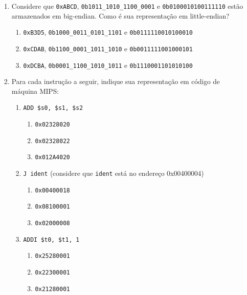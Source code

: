\documentclass{article}
\begin{document}
\begin{enumerate}
\begin{centering}
\end{centering}
\break

\item \large Considere que \verb|0xABCD|, \verb|0b1011_1010_1100_0001| e \verb|0b0100010100111110|  estão armazenados em big-endian. Como é sua representação em little-endian?

\begin{spacing}{1.5}
\begin{enumerate}
\item \verb|0xB3D5|, \verb|0b1000_0011_0101_1101| e \verb|0b0111110010100010|

\item \verb|0xCDAB|, \verb|0b1100_0001_1011_1010| e \verb|0b0011111001000101|%

\item \verb|0xDCBA|, \verb|0b0001_1100_1010_1011| e \verb|0b1110001101010100|
\end{enumerate}
\end{spacing}
\bigskip

\item \large Para cada instrução a seguir, indique sua representação em código de máquina MIPS:

\begin{spacing}{1.5}
\begin{enumerate}
\item \verb|ADD $s0, $s1, $s2|

\begin{enumerate}
\item \verb|0x02328020|%
\item \verb|0x02328022|
\item \verb|0x012A4020|
\end{enumerate}

\item \verb|J ident| (considere que \verb|ident| está no endereço 0x00400004)

\begin{enumerate}
\item \verb|0x00400018|
\item \verb|0x08100001|%
\item \verb|0x02000008|
\end{enumerate}

\item \verb|ADDI $t0, $t1, 1|

\begin{enumerate}
\item \verb|0x25280001|
\item \verb|0x22300001|
\item \verb|0x21280001|%
\end{enumerate}


\end{enumerate}
\end{spacing}
\end{enumerate}
\end{document}

